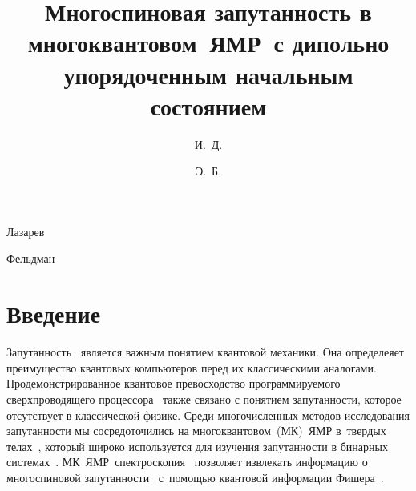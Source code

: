 \documentclass[utf8]{jetp}
\begin{document}
\title{Многоспиновая запутанность в многоквантовом~ЯМР~с дипольно упорядоченным начальным состоянием}

\author{И.~Д.}{Лазарев}

\author{Э.~Б.}{Фельдман}




\maketitle

\section{Введение}
\label{sec:1}

Запутанность~\cite{Nielsen_2009} является важным понятием квантовой механики.
Она определеяет преимущество квантовых компьютеров перед их классическими аналогами.
Продемонстрированное квантовое превосходство программируемого сверхпроводящего процессора~\cite{Arute2019} также связано с понятием запутанности, которое отсутствует в классической физике.
Среди многочисленных методов исследования запутанности мы сосредоточились на многоквантовом~(МК)~ЯМР в~твердых телах~\cite{Baum_1985}, который широко используется для изучения запутанности в бинарных системах~\cite{Furman_2008, Furman_2009, Fel_dman_2008, Fel_dman_2012}.
МК~ЯМР~спектроскопия~\cite{Baum_1985} позволяет извлекать информацию о многоспиновой запутанности~\cite{G_rttner_2018} с~помощью квантовой информации Фишера~\cite{T_th_2014, Pezz__2018}.
\end{document}
